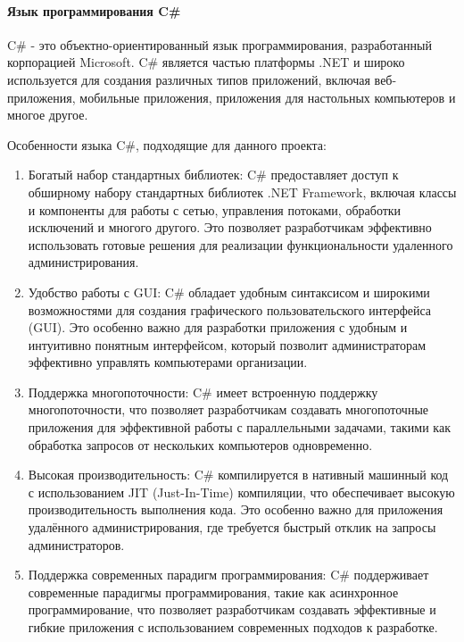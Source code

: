 \paragraph{Язык программирования C\#}

C\# - это объектно-ориентированный язык программирования, разработанный корпорацией Microsoft. C\# является частью платформы .NET и широко используется для создания различных типов приложений, включая веб-приложения, мобильные приложения, приложения для настольных компьютеров и многое другое.

Особенности языка C\#, подходящие для данного проекта:
\begin{enumerate}
	\item Богатый набор стандартных библиотек: C\# предоставляет доступ к обширному набору стандартных библиотек .NET Framework, включая классы и компоненты для работы с сетью, управления потоками, обработки исключений и многого другого. Это позволяет разработчикам эффективно использовать готовые решения для реализации функциональности удаленного администрирования.

	\item Удобство работы с GUI: C\# обладает удобным синтаксисом и широкими возможностями для создания графического пользовательского интерфейса (GUI). Это особенно важно для разработки приложения с удобным и интуитивно понятным интерфейсом, который позволит администраторам эффективно управлять компьютерами организации.

	\item Поддержка многопоточности: C\# имеет встроенную поддержку многопоточности, что позволяет разработчикам создавать многопоточные приложения для эффективной работы с параллельными задачами, такими как обработка запросов от нескольких компьютеров одновременно.

	\item Высокая производительность: C\# компилируется в нативный машинный код с использованием JIT (Just-In-Time) компиляции, что обеспечивает высокую производительность выполнения кода. Это особенно важно для приложения удалённого администрирования, где требуется быстрый отклик на запросы администраторов.

	\item Поддержка современных парадигм программирования: C\# поддерживает современные парадигмы программирования, такие как асинхронное программирование, что позволяет разработчикам создавать эффективные и гибкие приложения с использованием современных подходов к разработке.
\end{enumerate}

